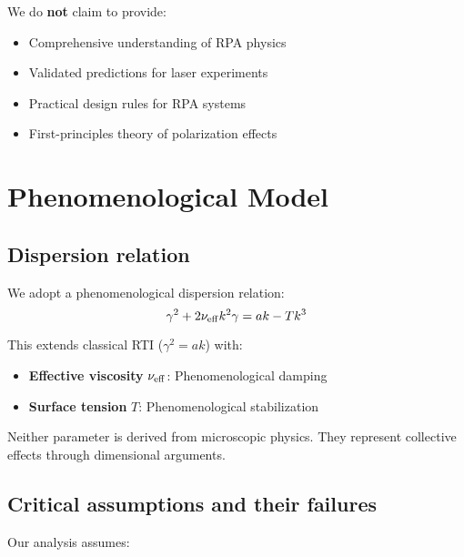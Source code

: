 \documentclass[aps,pre,twocolumn,showpacs,superscriptaddress]{revtex4-2}
\theoremstyle{definition}
\begin{document}
We do \textbf{not} claim to provide:
\begin{itemize}
\item Comprehensive understanding of RPA physics
\item Validated predictions for laser experiments
\item Practical design rules for RPA systems
\item First-principles theory of polarization effects
\end{itemize}

\section{Phenomenological Model}\label{sec:model}

\subsection{Dispersion relation}

We adopt a phenomenological dispersion relation:
\begin{equation}
\gamma^2 + 2\nu_{\rm eff}k^2\gamma = ak - Tk^3
\label{eq:dispersion}
\end{equation}

This extends classical RTI ($\gamma^2 = ak$) with:
\begin{itemize}
\item \textbf{Effective viscosity} $\nu_{\rm eff}$: Phenomenological damping
\item \textbf{Surface tension} $T$: Phenomenological stabilization
\end{itemize}

Neither parameter is derived from microscopic physics. They represent collective effects through dimensional arguments.

\subsection{Critical assumptions and their failures}

Our analysis assumes:
\end{document}
